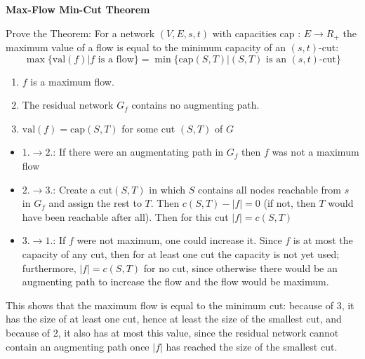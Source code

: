 \question \textbf{ Max-Flow Min-Cut Theorem}

Prove the Theorem:
For a network $(V, E, s, t)$ with capacities cap : $E \rightarrow R_+$ the maximum value of a flow is equal to the minimum capacity of an $(s, t)$-cut:
$$\max\{\text{val}(f) | f \text{ is a flow}\} = \min\{\text{cap}(S, T) | (S, T) \text{ is an }(s, t)\text{-cut}\}$$

\begin{enumerate}
\item $f$ is a maximum flow.
\item The residual network $G_f$ contains no augmenting path.
\item $\text{val}(f) = \text{cap}(S, T)$ for some cut $(S, T)$ of $G$
\end{enumerate}

\begin{solution}
\begin{itemize}
\item $1. \rightarrow 2.$: If there were an augmentating path in $G_f$ then $f$ was not a maximum flow
\item $2. \rightarrow 3.$: Create a cut$(S,T)$ in which $S$ contains all nodes reachable from $s$ in $G_f$ and assign the rest to $T$. Then $c(S,T)-|f|=0$ (if not, then $T$ would have been reachable after all). Then for this cut $|f|=c(S,T)$
\item $3. \rightarrow 1.$: If $f$ were not maximum, one could increase it. Since $f$ is at most the capacity of any cut, then for at least one cut the capacity is not yet used; furthermore, $|f|=c(S,T)$ for no cut, since otherwise there would be an augmenting path to increase the flow and the flow would be maximum.
\end{itemize}

This shows that the maximum flow is equal to the minimum cut: because of 3, it has the size of at least one cut, hence at least the size of the smallest cut, and because of 2, it also has at most this value, since the residual network cannot contain an augmenting path once $|f|$ has reached the size of the smallest cut.


\end{solution}


